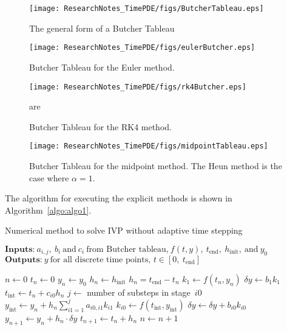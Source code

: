 \begin{figure}[!b]
\centering
\texttt{[image: ResearchNotes\_TimePDE/figs/ButcherTableau.eps]}
\caption{The general form of a Butcher Tableau}
\label{fig:butcherTab}
\end{figure}
\begin{figure}[!b]
\centering
\texttt{[image: ResearchNotes\_TimePDE/figs/eulerButcher.eps]}
\caption{Butcher Tableau for the Euler method.}
\label{fig:eulerButcher}
\end{figure}
\begin{figure}[!b]
\centering
\texttt{[image: ResearchNotes\_TimePDE/figs/rk4Butcher.eps]}
\caption{Butcher Tableau for the RK4 method.}
\label{fig:rk4Butcher}are
\end{figure}
\begin{figure}[!b]
\centering
\texttt{[image: ResearchNotes\_TimePDE/figs/midpointTableau.eps]}
\caption{Butcher Tableau for the midpoint method. The Heun method is the case where $\alpha=1$.}
\label{fig:midpointButcher}
\end{figure}

The algorithm for executing the explicit methods is shown in Algorithm~\ref{algo:algo1}.
\begin{algorithm}[H]
\caption{Numerical method to solve IVP without adaptive time stepping}
\label{algo:algo1}
\hspace*{\algorithmicindent} $\textbf{Inputs:}~a_{i,j},~b_{i}~\text{and}~c_{i}~\text{from Butcher tableau,}~f(t,y),~t_\text{end},~h_\text{init},~\text{and}~y_{0}$ \\
\hspace*{\algorithmicindent} $\textbf{Outputs:}~y~\text{for all discrete time points,~}t\in{}[0,~t_\text{end}] $
\begin{algorithmic}[1]
\State $n \gets 0$
\State $t_{n} \gets 0$
\State $y_{n} \gets y_{0}$
\State $h_{n} \gets h_\text{init}$
    \State $h_{n} = t_\text{end} - t_{n}$
  \EndIf
  \State $k_{1} \gets f(t_{n}, y_{n})$
  \State $\delta{}y \gets b_{1}k_{1}$
    \State $t_\text{int} \gets t_{n} + c_{i0}h_{n}$
    \State $j \gets$ number of substeps in stage~$i0$
    \State $y_\text{int} \gets y_{n} + h_{n}\sum^{j}_{i1=1}a_{i0,i1}k_{i1}$
    \State $k_{i0} \gets f(t_\text{int},y_\text{int})$
    \State $\delta{}y \gets \delta{}y + b_{i0}k_{i0}$
  \EndFor
  \State $y_{n+1} \gets y_{n} + h_{n}\cdot\delta{}y$
  \State $t_{n+1} \gets t_{n} + h_{n}$
  \State $n \gets n+1$
\EndWhile
\end{algorithmic}
\end{algorithm}

